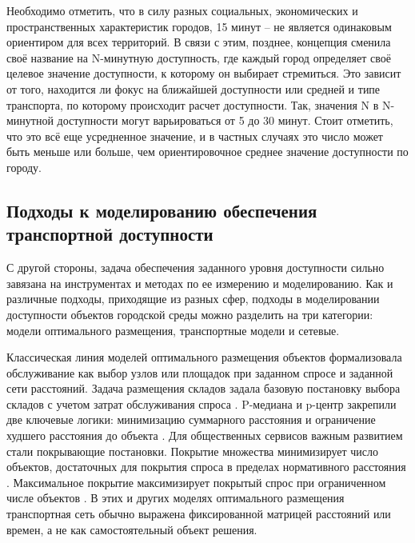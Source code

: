 Необходимо отметить, что в силу разных социальных, экономических и пространственных характеристик городов, 15 минут -- не является одинаковым ориентиром для всех территорий. В связи с этим, позднее, концепция сменила своё название на N-минутную доступность, где каждый город определяет своё целевое значение доступности, к которому он выбирает стремиться. Это зависит от того, находится ли фокус на ближайшей доступности или средней и типе транспорта, по которому происходит расчет доступности. Так, значения N в N-минутной доступности могут варьироваться от 5 до 30 минут. Стоит отметить, что это всё еще усредненное значение, и в частных случаях это число может быть меньше или больше, чем ориентировочное среднее значение доступности по городу.

\subsection{Подходы к моделированию обеспечения транспортной доступности}
\label{subsec:modeling-flp-tndp-trajectory}

С другой стороны, задача обеспечения заданного уровня доступности сильно завязана на инструментах и методах по ее измерению и моделированию. Как и различные подходы, приходящие из разных сфер, подходы в моделировании доступности объектов городской среды можно разделить на три категории: модели оптимального размещения, транспортные модели и сетевые.



Классическая линия моделей оптимального размещения объектов формализовала обслуживание как выбор узлов или площадок при заданном спросе и заданной сети расстояний. Задача размещения складов задала базовую постановку выбора складов с учетом затрат обслуживания спроса \cite{kuehn1963warehouse}. P-медиана и p-центр закрепили две ключевые логики: минимизацию суммарного расстояния и ограничение худшего расстояния до объекта \cite{hakimi1964medians}. Для общественных сервисов важным развитием стали покрывающие постановки. Покрытие множества минимизирует число объектов, достаточных для покрытия спроса в пределах нормативного расстояния \cite{toregas1971emergency}. Максимальное покрытие максимизирует покрытый спрос при ограниченном числе объектов \cite{church1974mclp}. В этих и других моделях оптимального размещения транспортная сеть обычно выражена фиксированной матрицей расстояний или времен, а не как самостоятельный объект решения.

